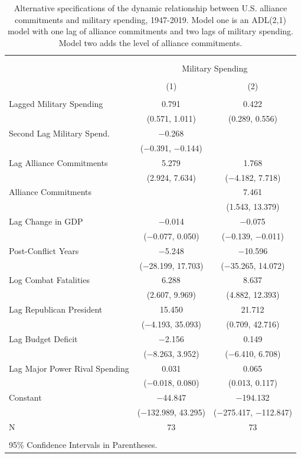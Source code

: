 \documentclass[12pt]{article}
\begin{document}
\begin{table}[!htbp] \centering 
\begin{tabular}{@{\extracolsep{5pt}}lcc} 
\\[-1.8ex]\hline \\[-1.8ex] 
\\[-1.8ex] & \multicolumn{2}{c}{Military Spending} \\ 
\\[-1.8ex] & (1) & (2)\\ 
\hline \\[-1.8ex] 
 Lagged Military Spending & 0.791$^{}$ & 0.422$^{}$ \\ 
  & (0.571, 1.011) & (0.289, 0.556) \\ 
  Second Lag Military Spend. & $-$0.268$^{}$ &  \\ 
  & ($-$0.391, $-$0.144) &  \\ 
  Lag Alliance Commitments & 5.279$^{}$ & 1.768 \\ 
  & (2.924, 7.634) & ($-$4.182, 7.718) \\ 
  Alliance Commitments &  & 7.461$^{}$ \\ 
  &  & (1.543, 13.379) \\ 
  Lag Change in GDP & $-$0.014 & $-$0.075$^{}$ \\ 
  & ($-$0.077, 0.050) & ($-$0.139, $-$0.011) \\ 
  Post-Conflict Years & $-$5.248 & $-$10.596 \\ 
  & ($-$28.199, 17.703) & ($-$35.265, 14.072) \\ 
  Log Combat Fatalities & 6.288$^{}$ & 8.637$^{}$ \\ 
  & (2.607, 9.969) & (4.882, 12.393) \\ 
  Lag Republican President & 15.450 & 21.712$^{}$ \\ 
  & ($-$4.193, 35.093) & (0.709, 42.716) \\ 
  Lag Budget Deficit & $-$2.156 & 0.149 \\ 
  & ($-$8.263, 3.952) & ($-$6.410, 6.708) \\ 
  Lag Major Power Rival Spending & 0.031 & 0.065$^{}$ \\ 
  & ($-$0.018, 0.080) & (0.013, 0.117) \\ 
  Constant & $-$44.847 & $-$194.132$^{}$ \\ 
  & ($-$132.989, 43.295) & ($-$275.417, $-$112.847) \\ 
 N & 73 & 73 \\ 
\hline \\[-1.8ex] 
\multicolumn{3}{l}{95\% Confidence Intervals in Parentheses.} \\ 
\end{tabular} 
  \caption{Alternative specifications of the dynamic relationship between U.S. alliance commitments and military spending, 1947-2019. Model one is an ADL(2,1) model with one lag of alliance commitments and two lags of military spending. Model two adds the level of alliance commitments.} 
  \label{tab:adl-coefs-lags} 
\end{table} 
\end{document}
